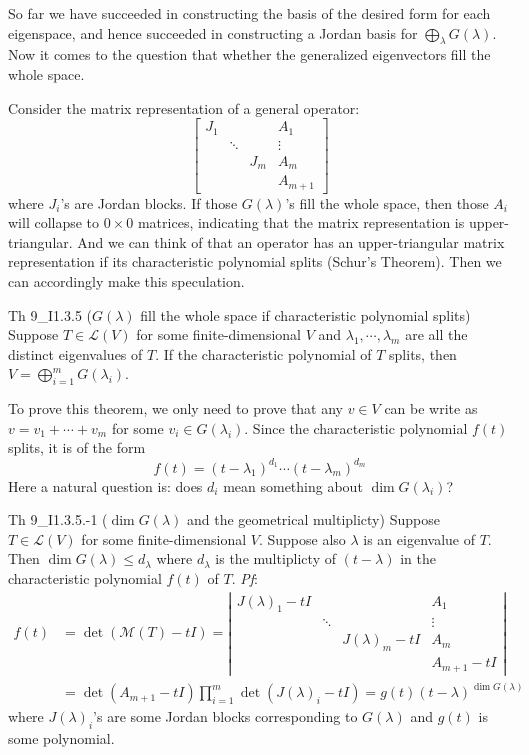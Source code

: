 \documentclass{article}
\begin{document}
So far we have succeeded in constructing the basis of the desired form for each eigenspace, and hence succeeded in constructing a Jordan basis for $\bigoplus_{\lambda} G(\lambda)$. Now it comes to the question that whether the generalized eigenvectors fill the whole space.

Consider the matrix representation of a general operator:
$$
\begin{bmatrix}
    J_1 & & & A_1 \\
     & \ddots & & \vdots \\
     & & J_m & A_m \\
     & & & A_{m+1}
\end{bmatrix}
$$
where $J_i$'s are Jordan blocks. If those $G(\lambda)$'s fill the whole space, then those $A_i$ will collapse to $0\times 0$ matrices, indicating that the matrix representation is upper-triangular. And we can think of that an operator has an upper-triangular matrix representation if its characteristic polynomial splits (Schur's Theorem). Then we can accordingly make this speculation.

\begin{Th}{Th 9\_I1.3.5 ($G(\lambda)$ fill the whole space if characteristic polynomial splits)}
    Suppose $T\in\mathcal{L}(V)$ for some finite-dimensional $V$ and $\lambda_1, \cdots, \lambda_m$ are all the distinct eigenvalues of $T$. If the characteristic polynomial of $T$ splits, then $V = \bigoplus_{i=1}^m G(\lambda_i)$.
\end{Th}

To prove this theorem, we only need to prove that any $v\in V$ can be write as $v=v_1+\cdots+v_m$ for some $v_i\in G(\lambda_i)$. Since the characteristic polynomial $f(t)$ splits, it is of the form 
    $$f(t) = (t-\lambda_1)^{d_1}\cdots (t-\lambda_m)^{d_m}$$
Here a natural question is: does $d_i$ mean something about $\dim G(\lambda_i)$?

\begin{Th}{Th 9\_I1.3.5.-1 ($\dim G(\lambda)$ and the geometrical multiplicty)}
    Suppose $T\in\mathcal{L}(V)$ for some finite-dimensional $V$. Suppose also $\lambda$ is an eigenvalue of $T$. Then $\dim G(\lambda) \leq d_\lambda$ where $d_\lambda$ is the multiplicty of $(t-\lambda)$ in the characteristic polynomial $f(t)$ of $T$.
    \tcblower
    \textit{Pf}: 
    $$
    \begin{aligned}
        f(t) &= \det(\mathcal{M}(T)-t I) = 
        \left|\begin{array}{cccc}
            J(\lambda)_1-tI & & & A_1 \\
            & \ddots & & \vdots \\
            & & J(\lambda)_m-tI & A_m \\
            & & & A_{m+1}-tI
        \end{array}\right| \\
        &= \det(A_{m+1}-tI)\prod_{i=1}^{m}\det(J(\lambda)_i-tI) = g(t)(t-\lambda)^{\dim G(\lambda)}
    \end{aligned}
    $$
    where $J(\lambda)_i$'s are some Jordan blocks corresponding to $G(\lambda)$ and $g(t)$ is some polynomial.
\end{Th}
\end{document}
